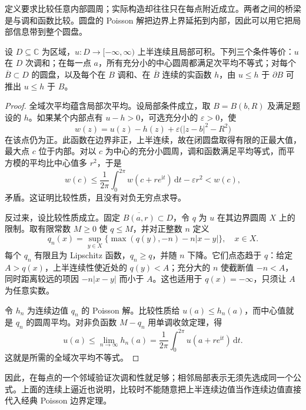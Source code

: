 定义要求比较任意内部圆周；实际构造却往往只在每点附近成立。两者之间的桥梁是与调和函数比较。圆盘的 Poisson 解把边界上界延拓到内部，因此可以用它把局部信息带到整个圆盘。
\begin{proposition}[局部判据与调和比较]\label{b3:prop:15-local-comparison}
设 \(D\subseteq\mathbb C\) 为区域，\(u:D\to[-\infty,\infty)\) 上半连续且局部可积。下列三个条件等价：\(u\) 在 \(D\) 次调和；在每一点 \(a\)，所有充分小的中心圆周都满足次平均不等式；对每个 \(\overline B\subset D\) 的圆盘，以及每个在 \(B\) 调和、在 \(\overline B\) 连续的实函数 \(h\)，由 \(u\le h\) 于 \(\partial B\) 可推出 \(u\le h\) 于 \(B\)。
\end{proposition}
\begin{proof}
全域次平均蕴含局部次平均。设局部条件成立，取 \(B=B(b,R)\) 及满足题设的 \(h\)。如果某个内部点有 \(u-h>0\)，可选充分小的 \(\varepsilon>0\)，使
\[
 w(z)=u(z)-h(z)+\varepsilon\bigl(|z-b|^2-R^2\bigr)
\]
在该点仍为正。此函数在边界非正，上半连续，故在闭圆盘取得有限的正最大值，最大点 \(c\) 位于内部。对以 \(c\) 为中心的充分小圆周，调和函数满足平均等式，而平方模的平均比中心值多 \(r^2\)，于是
\[
 w(c)\le\frac1{2\pi}\int_0^{2\pi}w(c+re^{\mathrm{i}t})\,\mathrm{d}t
          -\varepsilon r^2<w(c),
\]
矛盾。这证明比较性质，且没有对负无穷点求导。

反过来，设比较性质成立。固定 \(\overline{B(a,r)}\subset D\)，令 \(q\) 为 \(u\) 在其边界圆周 \(X\) 上的限制。取有限常数 \(M\ge0\) 使 \(q\le M\)，并对正整数 \(n\) 定义
\[
 q_n(x)=\sup_{y\in X}\{\max(q(y),-n)-n|x-y|\},
 \quad x\in X.
\]
每个 \(q_n\) 有限且为 Lipschitz 函数，\(q_n\ge q\)，并随 \(n\) 下降。它们点态趋于 \(q\)：给定 \(A>q(x)\)，上半连续性使近处的 \(q(y)<A\)；充分大的 \(n\) 使截断值 \(-n<A\)，同时距离较远的项因 \(-n|x-y|\) 而小于 \(A\)。这也适用于 \(q(x)=-\infty\)，只须让 \(A\) 为任意实数。

令 \(h_n\) 为连续边值 \(q_n\) 的 Poisson 解。比较性质给 \(u(a)\le h_n(a)\)，而中心值就是 \(q_n\) 的圆周平均。对非负函数 \(M-q_n\) 用单调收敛定理，得
\[
 u(a)\le\lim_{n\to\infty}h_n(a)
       =\frac1{2\pi}\int_0^{2\pi}u(a+re^{\mathrm{i}t})\,\mathrm{d}t.
\]
这就是所需的全域次平均不等式。
\end{proof}
因此，在每点的一个邻域验证次调和性就足够；相邻局部表示无须先选成同一个公式。上面的连续上逼近也说明，比较时不能随意把上半连续边值当作连续边值直接代入经典 Poisson 边界定理。

